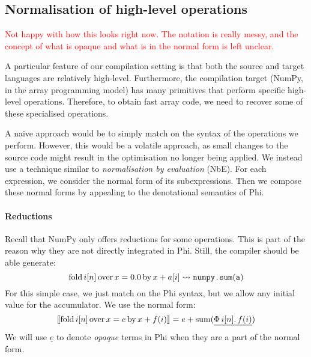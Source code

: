 \subsection{Normalisation of high-level operations}

\begin{center}
    \textcolor{red}{Not happy with how this looks right now. The notation is really messy, and the concept of what is opaque and what is in the normal form is left unclear.}
\end{center}


A particular feature of our compilation setting is that both the source and target languages are relatively high-level. Furthermore, the compilation target (NumPy, in the array programming model) has many primitives that perform specific high-level operations. Therefore, to obtain fast array code, we need to recover some of these specialised operations.

A naive approach would be to simply match on the syntax of the operations we perform. However, this would be a volatile approach, as small changes to the source code might result in the optimisation no longer being applied. We instead use a technique similar to \textit{normalisation by evaluation} (NbE). For each expression, we consider the normal form of its subexpressions. Then we compose these normal forms by appealing to the denotational semantics of Phi.

\paragraph{Reductions} Recall that NumPy only offers reductions for some operations. This is part of the reason why they are not directly integrated in Phi. Still, the compiler should be able generate:
$$ \mathrm{fold}\,{i}[{n}]\,\mathrm{over}\,{x} = {0.0}\,\mathrm{by}\,{x + a[i]} \leadsto \texttt{numpy.sum}(\texttt{a}) $$
For this simple case, we just match on the Phi syntax, but we allow any initial value for the accumulator. We use the normal form:
$$ \left\llbracket \phifold{i}{n}{x}{e}{x + f(i)} \right\rrbracket = e + \mathrm{sum}( \underline{\phivec{i}{n}{f(i)}} ) $$
We will use $\underline{e}$ to denote \textit{opaque} terms in Phi when they are a part of the normal form.

